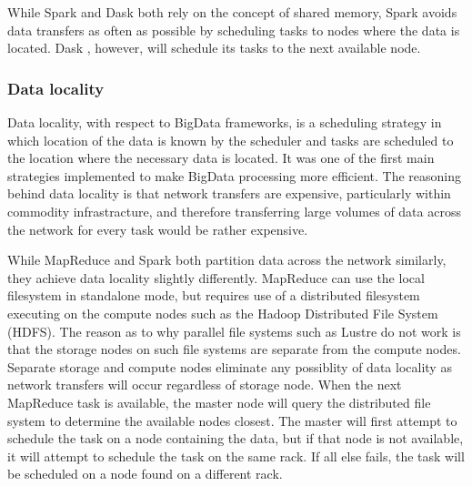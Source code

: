 \documentclass{report}
\begin{document}
                    
                    While Spark and Dask both rely on the concept of shared 
                    memory, Spark avoids data transfers as often as possible by
                    scheduling tasks to nodes where the data is located. Dask
                    , however, will schedule its tasks to the next available 
                    node.
                    
                    
                \subsubsection{Data locality}
                    Data locality, with respect to BigData frameworks, is a
                    scheduling
                    strategy in which location of the data is known by the 
                    scheduler and tasks are scheduled to the location where the
                    necessary data is located. It was one of the first main 
                    strategies implemented to make BigData processing more 
                    efficient. The reasoning behind data locality is that 
                    network transfers are expensive, particularly within 
                    commodity infrastracture, and therefore transferring large 
                    volumes of data across the network for every task would be 
                    rather expensive.

                    While MapReduce and Spark both partition data across the 
                    network similarly, they achieve data locality slightly 
                    differently. MapReduce can use the local filesystem in 
                    standalone mode, but requires use of a distributed 
                    filesystem executing on the compute nodes such as the 
                    Hadoop Distributed File System (HDFS). The reason as to why
                    parallel file systems such as Lustre do not work is that 
                    the storage nodes on such file systems are separate from 
                    the compute nodes. Separate storage and compute nodes 
                    eliminate any possiblity of data locality as network 
                    transfers will occur regardless of storage node. When the 
                    next MapReduce task is available, the master node will 
                    query the distributed file system to determine the 
                    available nodes closest. The master will first attempt to
                    schedule the task on a node containing the data, but if 
                    that node is not available, it will attempt to schedule
                    the task on the same rack. If all else fails, the task will
                    be scheduled on a node found on a different rack. 
\end{document}
